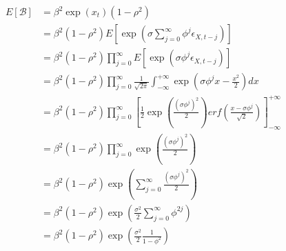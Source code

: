 \documentclass[11pt,a4,twosided,singlespacing,titlepagenumber=on]{scrreprt}
\numberwithin{equation}{chapter} %
\theoremstyle{remark}
\begin{document}
\begin{align*}
	E[\mathcal{B}] &= \beta^2 \exp(x_t) (1-\rho^2)\\
				   &= \beta^2 (1-\rho^2) E \left[ \exp \left( \sigma \sum_{j=0}^\infty \phi^j \epsilon_{X, t-j}\right) \right]\\
				   &= \beta^2 (1-\rho^2) \prod_{j=0}^\infty E\left[\exp \left( \sigma \phi^j \epsilon_{X, t-j} \right)  \right] \\
				   &= \beta^2 (1-\rho^2) \prod_{j=0}^\infty \frac{1}{\sqrt{2\pi}}\int^{+\infty}_{-\infty} \exp \left (\sigma \phi^j x - \frac{x^2}{2} \right) dx \\
				   &= \beta^2 (1-\rho^2) \prod_{j=0}^\infty \left[\frac{1}{2} \exp \left(\frac{(\sigma \phi^j)^2}{2} \right) erf \left(\frac{x - \sigma\phi^j}{\sqrt{2}}\right)\right]^{+\infty}_{-\infty} \\
				   &= \beta^2 (1-\rho^2) \prod_{j=0}^\infty \exp \left(\frac{(\sigma \phi^j)^2}{2} \right) \\
				   &= \beta^2 (1-\rho^2) \exp \left( \sum_{j=0}^\infty \frac{(\sigma \phi^j)^2}{2} \right) \\
				   &= \beta^2 (1-\rho^2) \exp \left( \frac{\sigma^2}{2} \sum_{j=0}^\infty \phi^{2j} \right) \\
				   &= \beta^2 (1-\rho^2) \exp \left( \frac{\sigma^2}{2} \frac{1}{1-\phi^{2}}\right)
\end{align*}

\end{document}
